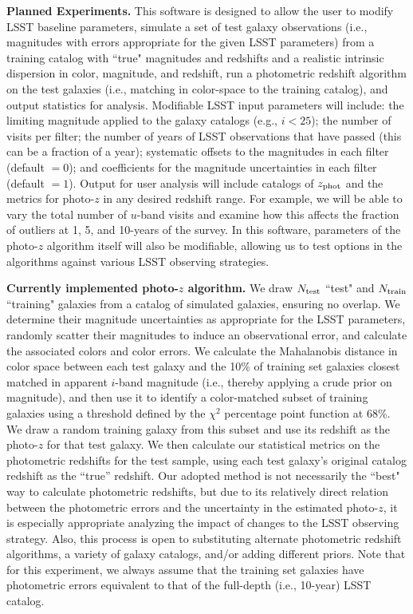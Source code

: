\textbf{Planned Experiments.} This software is designed to allow the
user to modify LSST baseline parameters, simulate a set of test galaxy
observations (i.e., magnitudes with errors appropriate for the given
LSST parameters) from a training catalog with ``true" magnitudes and
redshifts and a realistic intrinsic dispersion in color, magnitude, and
redshift, run a photometric redshift algorithm on the test galaxies
(i.e., matching in color-space to the training catalog), and output
statistics for analysis. Modifiable LSST input parameters will include:
the limiting magnitude applied to the galaxy catalogs (e.g., $i<25$);
the number of visits per filter; the number of years of LSST
observations that have passed (this can be a fraction of a year);
systematic offsets to the magnitudes in each filter (default $=0$); and
coefficients for the magnitude uncertainties in each filter (default
$=1$).  Output for user analysis will include catalogs of $z_{\rm phot}$
and the metrics for photo-$z$
in any desired redshift range. For example, we will be able to vary the
total number of $u$-band visits and examine how this affects the
fraction of outliers at 1, 5, and 10-years of the survey. In this
software, parameters of the photo-$z$ algorithm itself will also be
modifiable, allowing us to test options in the algorithms against
various LSST observing strategies.

\textbf{Currently implemented photo-$z$ algorithm.} We draw $N_{\rm
test}$ ``test" and $N_{\rm train}$ ``training" galaxies from a catalog of
simulated galaxies, ensuring no overlap. We determine their
magnitude uncertainties as appropriate for the LSST parameters, randomly
scatter their magnitudes to induce an observational error, and calculate
the associated colors and color errors. 
We calculate the Mahalanobis distance \citep{Mahalanobis1936} in color space
between each test galaxy and the 10\% of training set galaxies closest matched
in apparent $i$-band magnitude (i.e., thereby applying a crude prior on magnitude),
and then use it to identify a color-matched subset of
training galaxies using a threshold defined by the $\chi^2$ percentage point function at 68\%.
We draw a random training galaxy from this subset and use its redshift as the
photo-$z$ for that test galaxy. We then calculate our statistical
metrics on the photometric redshifts for the test sample, using each
test galaxy's original catalog redshift as the ``true'' redshift.
Our adopted method is not necessarily the ``best" way to calculate photometric redshifts,
but due to its relatively direct relation between the photometric errors
and the uncertainty in the estimated photo-$z$, it is especially appropriate analyzing the impact of changes
to the LSST observing strategy.
Also, this process is open to substituting alternate photometric redshift
algorithms, a variety of galaxy catalogs, and/or adding different priors.
Note that for this experiment, we always assume that the
training set galaxies have photometric errors equivalent to that of the
full-depth (i.e., 10-year) LSST catalog. 

